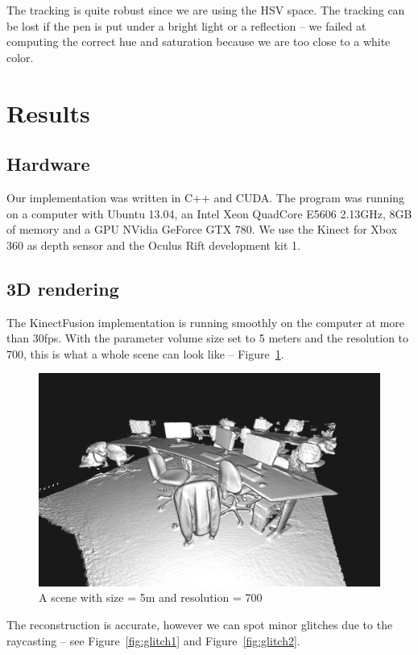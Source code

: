 \documentclass[12pt]{article}
\begin{document}
The tracking is quite robust since we are using the HSV space. The tracking can be lost if the pen is put under a bright light or a reflection -- we failed at computing the correct hue and saturation because we are too close to a white color.

\newpage
\section{Results}
\subsection{Hardware}
Our implementation was written in C++ and CUDA. The program was running on a computer with Ubuntu 13.04, an Intel Xeon QuadCore E5606 2.13GHz, 8GB of memory and a GPU NVidia GeForce GTX 780. We use the Kinect for Xbox 360 as depth sensor and the Oculus Rift development kit 1.
\subsection{3D rendering}
The KinectFusion implementation is running smoothly on the computer at more than 30fps. With the parameter volume size set to 5 meters and the resolution to 700, this is what a whole scene can look like -- Figure~\ref{fig:totalscene}.

\begin{figure}[!h]
  \centering
  \includegraphics[scale=0.3]{WholeScene.png}
  \caption{\label{fig:totalscene} A scene with size = 5m and resolution = 700}
\end{figure}

The reconstruction is accurate, however we can spot minor glitches due to the raycasting -- see Figure~\ref{fig:glitch1} and Figure~\ref{fig:glitch2}.
\end{document}
